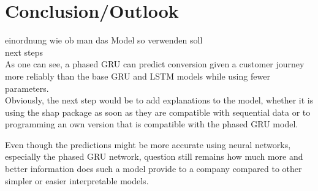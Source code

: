 \chapter{Conclusion/Outlook}

\color{red} einordnung wie ob man das Model so verwenden soll\\
next steps \color{black} \\


As one can see, a phased GRU can predict conversion given a customer journey more reliably than the base GRU and LSTM models while using fewer parameters.\\ 

Obviously, the next step would be to add explanations to the model, whether it is using the shap package as soon as they are compatible with sequential data or to programming an own version that is compatible with the phased GRU model. 

Even though the predictions might be more accurate using neural networks, especially the phased GRU network, question still remains how much more and better information does such a model provide to a company compared to other simpler or easier interpretable models.
